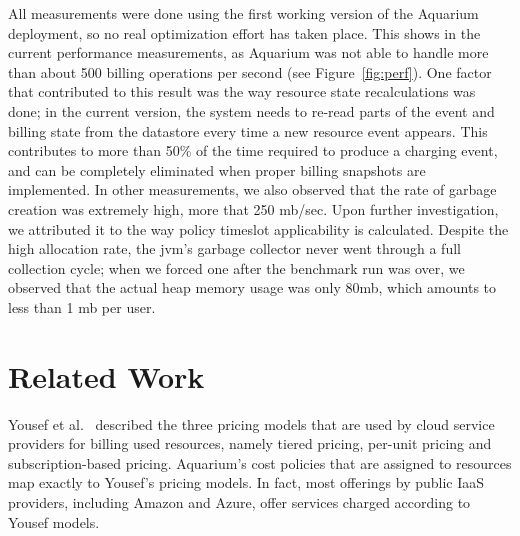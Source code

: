 \documentclass[letterpaper,twocolumn,10pt]{article}
\begin{document}
All measurements were done using the first working version of the
Aquarium deployment, so no real optimization effort has taken place.
This shows in the current performance measurements, as Aquarium was
not able to handle more than about 500 billing operations per second
(see Figure~\ref{fig:perf}). One factor that contributed to this result
was the way resource state recalculations was done; in the current
version, the system needs to re-read parts of the event and billing
state from the datastore every time a new resource event appears. This
contributes to more than 50\% of the time required to produce a
charging event, and can be completely eliminated when proper billing
snapshots are implemented. In other measurements, we also observed
that the rate of garbage creation was extremely high, more that 250
{\sc mb}/sec. Upon further investigation, we attributed it to the way
policy timeslot applicability is calculated. Despite the high
allocation rate, the {\sc jvm}'s garbage collector never went through
a full collection cycle; when we forced one after the benchmark run
was over, we observed that the actual heap memory usage was only
80{\sc mb}, which amounts to less than 1 {\sc mb} per user.




\section{Related Work}

Yousef et al.~\cite{Youse08} described the three pricing models that
are used by cloud service providers for billing used resources, namely
tiered pricing, per-unit pricing and subscription-based pricing.
Aquarium's cost policies that are assigned to resources map exactly to
Yousef's pricing models. In fact, most offerings by public IaaS
providers, including Amazon and Azure, offer services charged
according to Yousef models.
\end{document}
